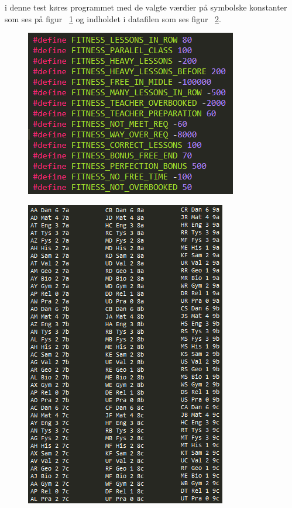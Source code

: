 i denne test køres programmet med de valgte værdier på symbolske konstanter som ses på figur ~\ref{fig:def} og indholdet i datafilen som ses figur ~\ref{fig:info}.

\begin{figure}[!h]
  \includegraphics[scale = 1]{partials/graphics/programtestdef.png}
  \caption{}
  \label{fig:def}
\end{figure}

\begin{figure}[!h]
  \includegraphics[scale = 1]{partials/graphics/programtestinfo.png}
  \caption{}
  \label{fig:info}
\end{figure}

